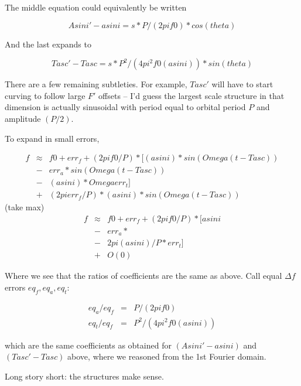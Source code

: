 \documentclass{article}
\begin{document}
The middle equation could equivalently be written

\begin{equation}
Asini' - a sin i = s * P/(2 pi f0) * cos(theta)
\end{equation}

And the last expands to

\begin{equation}
Tasc' - Tasc     = s * P^2/(4 pi^2 f0 (a sin i)) * sin(theta)
\end{equation}

There are a few remaining subtleties. For example, $Tasc'$ will have to
start curving to follow large $F'$ offsets -- I'd guess the largest scale
structure in that dimension is actually sinusoidal with period equal to
orbital period $P$ and amplitude $(P/2)$.

To expand in small errors,

\begin{eqnarray}
f &\approx& f0 + err_f + (2pi f0/P)*[
                     (a sin i)*sin(Omega(t-Tasc)) \\
                   &-& err_a * sin(Omega(t-Tasc)) \\
                   &-& (a sin i) * Omega err_t] \\
                   &+& (2pi err_f/P)*(a sin i)*sin(Omega(t-Tasc))
\end{eqnarray}
  (take max)
\begin{eqnarray}
f &\approx& f0 + err_f + (2pi f0/P)*[
                     a sin i \\ 
                   &-& err_a * \\
                   &-& 2 pi (a sin i)/P * err_t] \\
                   &+& O(0)
\end{eqnarray}

Where we see that the ratios of coefficients are the same as above. Call
equal $\Delta f$ errors $eq_f, eq_a, eq_t$:

\begin{eqnarray}
eq_a / eq_f &=& P / (2 pi f0)\\
eq_t / eq_f &=& P^2/(4 pi^2 f0 (a sin i))
\end{eqnarray}

which are the same coefficients as obtained for $(Asini' - a sin i)$ and
$(Tasc' - Tasc)$ above, where we reasoned from the 1st Fourier domain.

Long story short: the structures make sense.
\end{document}
